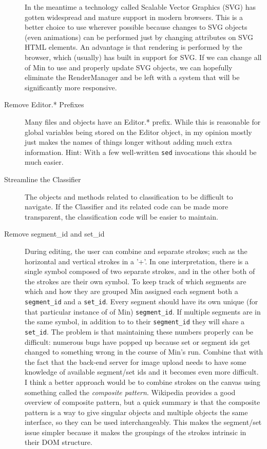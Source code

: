 \documentclass[letterpaper]{article}
\begin{document}
\begin{description}
        In the meantime a technology called Scalable Vector Graphics (SVG) has
        gotten widespread and mature support in modern browsers. This is a
        better choice to use wherever possible because changes to SVG objects
        (even animations) can be performed just by changing attributes on SVG
        HTML elements. An advantage is that rendering is performed by the
        browser, which (usually) has built in support for SVG. If we can change
        all of Min to use and properly update SVG objects, we can hopefully
        eliminate the RenderManager and be left with a system that will be
        significantly  more responsive.
    \item[Remove Editor.* Prefixes] Many files and objects have an Editor.*
        prefix. While this is reasonable for global variables being stored on
        the Editor object, in my opinion mostly just makes the names of things longer
        without adding much extra information. Hint: With a few well-written
        \verb+sed+ invocations this should be much easier.
    \item[Streamline the Classifier] The objects and methods related to
        classification to be difficult to navigate. If the Classifier and its
        related code can be made more transparent, the classification code will
        be easier to maintain.
    \item[Remove segment\_id and set\_id] During editing, the
        user can combine and separate strokes; such as the horizontal and
        vertical strokes in a '+'. In one interpretation, there is a single
        symbol composed of two separate strokes, and in the other both of the
        strokes are their own symbol. To keep track of which segments are which
        and how they are grouped Min assigned each segment both a
        \verb+segment_id+ and a \verb+set_id+. Every segment should have its own
        unique (for that particular instance of of Min) \verb+segment_id+. If multiple segments are in the
        same symbol, in addition to to their \verb+segment_id+ they will share
        a \verb+set_id+. The problem is that maintaining these numbers properly
        can be difficult: numerous bugs have popped up because set or segment
        ids get changed to something wrong in the course of Min's run. Combine
        that with the fact that the back-end server for image upload needs to
        have some knowledge of available segment/set ids and it becomes even
        more difficult. I think a better approach would be to combine strokes on
        the canvas using something called the \emph{composite pattern}.
        Wikipedia provides a good overview of composite pattern, but a quick
        summary is that the composite pattern is a way to give singular objects
        and multiple objects the same interface, so they can be used
        interchangeably. This makes the segment/set issue simpler because it
        makes the groupings of the strokes intrinsic in their DOM structure.  %
\end{description}
\end{document}
